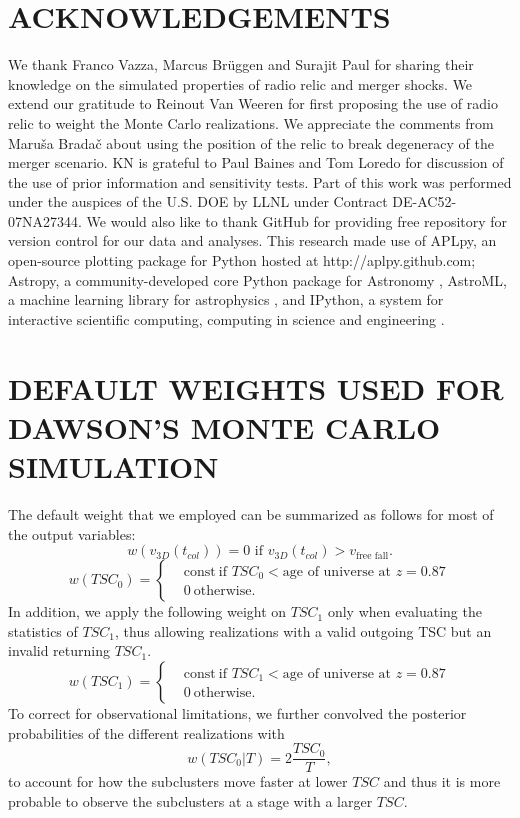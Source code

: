 \section{ACKNOWLEDGEMENTS}
We thank Franco Vazza, Marcus Br\"{u}ggen and Surajit Paul for sharing
their knowledge on the simulated properties of radio relic and merger
shocks. We extend our gratitude to Reinout Van Weeren for first proposing the use of
radio relic to weight the Monte Carlo realizations. We appreciate the
comments from Maru\v{s}a Brada\v{c} about using the position of the relic to
break degeneracy of the merger scenario. KN is grateful to Paul Baines and
Tom Loredo for discussion of the use of prior information and sensitivity tests. 
Part of this work was performed under the auspices of the U.S. DOE by LLNL
under Contract DE-AC52-07NA27344. We would also like to thank 
GitHub for providing free repository for version control for our data and
analyses. This research made use of APLpy, an open-source plotting package for Python
hosted at http://aplpy.github.com; Astropy, a community-developed core
Python package for Astronomy \citep{astropy}, AstroML, a
machine learning library for astrophysics \citep{VanderPlas2012}, and IPython, a system for
interactive scientific computing, computing in science and engineering
\citep{Perez2007} .


\appendix
\section{DEFAULT WEIGHTS USED FOR DAWSON'S MONTE CARLO SIMULATION}
\label{app:priors}
The default weight that we employed can be summarized as
follows for most of the output variables: 
\begin{equation}
	w(v_{3D}(t_{col})) = 0\text{ if }v_{3D}(t_{col}) >
	v_{\text{free fall}}. 
\end{equation}
\begin{equation}
	w(TSC_0) = 
	\begin{cases}
		& \text{const}~\text{if }TSC_0 < \text{age of universe at } z=0.87	\\
		& 0~\text{otherwise}.
	\end{cases}
\end{equation}
In addition, we apply the following weight on $TSC_1$ only when evaluating the
statistics of $TSC_1$, thus allowing realizations with a valid
outgoing TSC but an invalid returning $TSC_1$. 
\begin{equation}
	w(TSC_1) = 
	\begin{cases}
		& \text{const}~\text{if }TSC_1 < \text{age of universe at } z=0.87	\\
		& 0~\text{otherwise} \label{eqn:TSM_1}.
	\end{cases}
\end{equation}
To correct for observational limitations, we further convolved the
posterior probabilities of the different realizations with 
\begin{equation}
	w(TSC_0 | T) = 2 \frac{TSC_0}{T},
\end{equation}
to account for how the subclusters move faster at lower $TSC$ and thus it
is more probable to observe the subclusters at a stage with a larger $TSC$.
\par 
